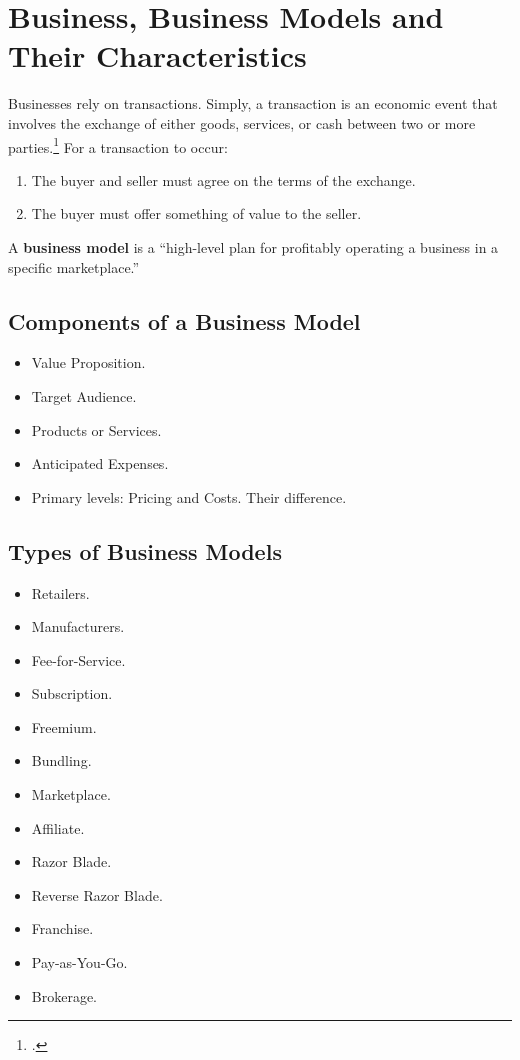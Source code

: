 \section{Business, Business Models and Their Characteristics}

Businesses rely on transactions. Simply, a transaction is an economic event that
involves the exchange of either goods, services, or cash between two or more
parties.\footcite{shopify_transaction} For a transaction to occur:

\begin{enumerate}
    \item The buyer and seller must agree on the terms of the exchange.
    \item The buyer must offer something of value to the seller.
\end{enumerate}

A \textbf{business model} is a ``high-level plan for profitably operating a business
in a specific marketplace.''

\subsection{Components of a Business Model}

\begin{itemize}
    \item Value Proposition.
    \item Target Audience.
    \item Products or Services.
    \item Anticipated Expenses.
    \item Primary levels: Pricing and Costs. Their difference.
\end{itemize}

\subsection{Types of Business Models}

\begin{itemize}
    \item Retailers.
    \item Manufacturers.
    \item Fee-for-Service.
    \item Subscription.
    \item Freemium.
    \item Bundling.
    \item Marketplace.
    \item Affiliate.
    \item Razor Blade.
    \item Reverse Razor Blade.
    \item Franchise.
    \item Pay-as-You-Go.
    \item Brokerage.
\end{itemize}

